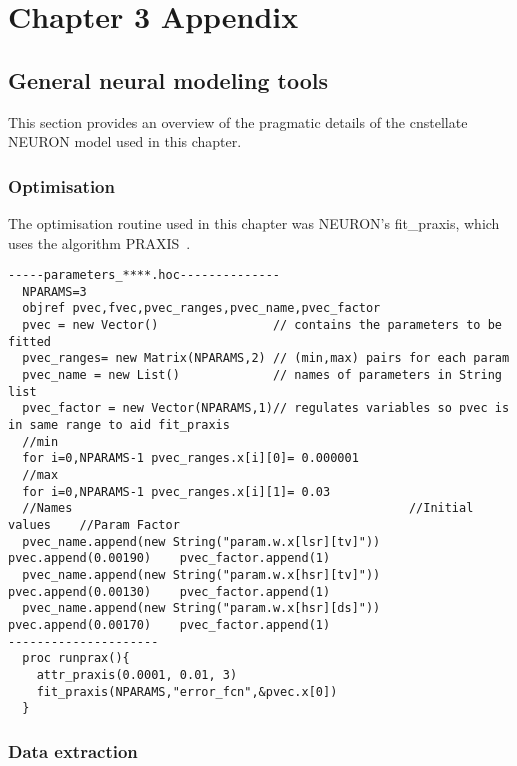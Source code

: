 
\section{Chapter 3 Appendix    \label{sec:ch3:appendix}}

\subsection{General neural modeling tools}

This section provides an overview of the pragmatic details of the \textsf{cnstellate} NEURON model used in this chapter.

\subsubsection{Optimisation}

The optimisation routine used in this chapter was NEURON's \textsf{fit\_praxis},
which uses the algorithm PRAXIS~\citep{Brent:1976}.

\begin{lstlisting}[label=lbl:runprax,caption=Set optimisation attributes and run fitting procedure.]
-----parameters_****.hoc--------------
  NPARAMS=3
  objref pvec,fvec,pvec_ranges,pvec_name,pvec_factor
  pvec = new Vector()                // contains the parameters to be fitted
  pvec_ranges= new Matrix(NPARAMS,2) // (min,max) pairs for each param
  pvec_name = new List()             // names of parameters in String list
  pvec_factor = new Vector(NPARAMS,1)// regulates variables so pvec is in same range to aid fit_praxis
  //min
  for i=0,NPARAMS-1 pvec_ranges.x[i][0]= 0.000001
  //max
  for i=0,NPARAMS-1 pvec_ranges.x[i][1]= 0.03
  //Names                                               //Initial values	//Param Factor
  pvec_name.append(new String("param.w.x[lsr][tv]"))	pvec.append(0.00190)	pvec_factor.append(1)
  pvec_name.append(new String("param.w.x[hsr][tv]"))	pvec.append(0.00130)	pvec_factor.append(1)
  pvec_name.append(new String("param.w.x[hsr][ds]"))	pvec.append(0.00170)	pvec_factor.append(1)
---------------------
  proc runprax(){
    attr_praxis(0.0001, 0.01, 3)
    fit_praxis(NPARAMS,"error_fcn",&pvec.x[0])
  }
\end{lstlisting}


\subsubsection{Data extraction    \label{sec:data-extraction}}

